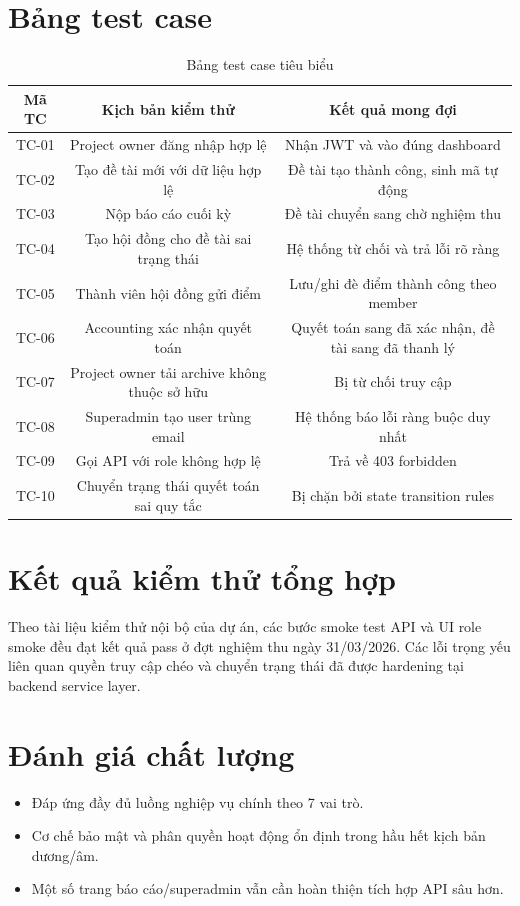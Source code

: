 \documentclass[12pt,a4paper]{report}
\begin{document}
\section{Bảng test case}
\begin{table}[H]
\centering
\begin{tabular}{|c|c|c|}
\hline
\textbf{Mã TC} & \textbf{Kịch bản kiểm thử} & \textbf{Kết quả mong đợi} \\ \hline
TC-01 & Project owner đăng nhập hợp lệ & Nhận JWT và vào đúng dashboard \\ \hline
TC-02 & Tạo đề tài mới với dữ liệu hợp lệ & Đề tài tạo thành công, sinh mã tự động \\ \hline
TC-03 & Nộp báo cáo cuối kỳ & Đề tài chuyển sang chờ nghiệm thu \\ \hline
TC-04 & Tạo hội đồng cho đề tài sai trạng thái & Hệ thống từ chối và trả lỗi rõ ràng \\ \hline
TC-05 & Thành viên hội đồng gửi điểm & Lưu/ghi đè điểm thành công theo member \\ \hline
TC-06 & Accounting xác nhận quyết toán & Quyết toán sang đã xác nhận, đề tài sang đã thanh lý \\ \hline
TC-07 & Project owner tải archive không thuộc sở hữu & Bị từ chối truy cập \\ \hline
TC-08 & Superadmin tạo user trùng email & Hệ thống báo lỗi ràng buộc duy nhất \\ \hline
TC-09 & Gọi API với role không hợp lệ & Trả về 403 forbidden \\ \hline
TC-10 & Chuyển trạng thái quyết toán sai quy tắc & Bị chặn bởi state transition rules \\ \hline
\end{tabular}
\caption{Bảng test case tiêu biểu}
\end{table}

\section{Kết quả kiểm thử tổng hợp}
Theo tài liệu kiểm thử nội bộ của dự án, các bước smoke test API và UI role smoke đều đạt kết quả pass ở đợt nghiệm thu ngày 31/03/2026. Các lỗi trọng yếu liên quan quyền truy cập chéo và chuyển trạng thái đã được hardening tại backend service layer.

\section{Đánh giá chất lượng}
\begin{itemize}[leftmargin=1.2cm]
\item Đáp ứng đầy đủ luồng nghiệp vụ chính theo 7 vai trò.
\item Cơ chế bảo mật và phân quyền hoạt động ổn định trong hầu hết kịch bản dương/âm.
\item Một số trang báo cáo/superadmin vẫn cần hoàn thiện tích hợp API sâu hơn.
\end{itemize}
\end{document}
